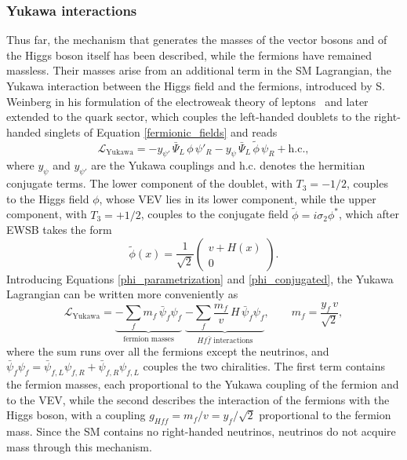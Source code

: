 \subsubsection{Yukawa interactions}
\label{subsubsec:yukawa}
Thus far, the mechanism that generates the masses of the vector bosons and of the Higgs boson itself has been described, while the fermions have remained massless. Their masses arise from an additional term in the SM Lagrangian, the Yukawa interaction between the Higgs field and the fermions, introduced by S. Weinberg in his formulation of the electroweak theory of leptons~\cite{Weinberg:1967tq} and later extended to the quark sector, which couples the left-handed doublets to the right-handed singlets of Equation \ref{fermionic_fields} and reads
\begin{equation}
    \mathcal{L}_{\text{Yukawa}} = -y_{\psi'}\, \bar{\Psi}_L\, \phi\, \psi'_R - y_{\psi}\, \bar{\Psi}_L\, \tilde{\phi}\, \psi_R + \text{h.c.},
    \label{yukawa_lagrangian}
\end{equation}
%
where $y_{\psi}$ and $y_{\psi'}$ are the Yukawa couplings and h.c. denotes the hermitian conjugate terms. The lower component of the doublet, with $T_3=-1/2$, couples to the Higgs field $\phi$, whose VEV lies in its lower component, while the upper component, with $T_3=+1/2$, couples to the conjugate field $\tilde{\phi} = i\sigma_2\phi^*$, which after EWSB takes the form
\begin{equation}
    \tilde{\phi}(x) = \frac{1}{\sqrt{2}} \begin{pmatrix} v + H(x) \\ 0 \end{pmatrix}.
    \label{phi_conjugated}
\end{equation}
%
Introducing Equations \ref{phi_parametrization} and \ref{phi_conjugated}, the Yukawa Lagrangian can be written more conveniently as
\begin{equation}
    \mathcal{L}_{\text{Yukawa}} =
    \underbrace{-\sum_f m_f\, \bar{\psi}_f \psi_f}_{\text{fermion masses}}
    \;\underbrace{-\sum_f \frac{m_f}{v}\, H\, \bar{\psi}_f \psi_f}_{Hf\bar{f}\text{ interactions}},
    \qquad m_f = \frac{y_f\, v}{\sqrt{2}},
    \label{eq:yukawa_masses}
\end{equation}
%
where the sum runs over all the fermions except the neutrinos, and $\bar{\psi}_f\psi_f = \bar{\psi}_{f,L}\psi_{f,R} + \bar{\psi}_{f,R}\psi_{f,L}$ couples the two chiralities. The first term contains the fermion masses, each proportional to the Yukawa coupling of the fermion and to the VEV, while the second describes the interaction of the fermions with the Higgs boson, with a coupling $g_{Hff} = m_f/v = y_f/\sqrt{2}$ proportional to the fermion mass. Since the SM contains no right-handed neutrinos, neutrinos do not acquire mass through this mechanism.\bigskip
